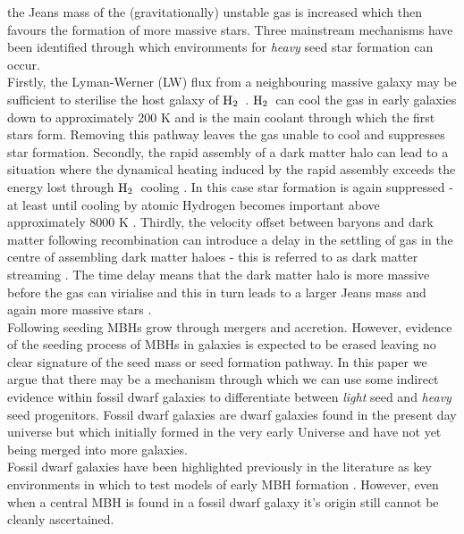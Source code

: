 \documentclass[twocolumn, tighten]{aastex631}
\newcommand{\molH} {$\rm{H_2}$~}
\begin{document}
the Jeans mass of the (gravitationally) unstable gas is increased which then favours the formation of more massive stars. Three mainstream mechanisms have been identified through 
which environments for \textit{heavy} seed star formation can occur. \\
\indent Firstly, the Lyman-Werner (LW) flux from a neighbouring massive galaxy may be sufficient to sterilise the host galaxy of \molH \citep{Dijkstra_2008, Dijkstra_2014, Visbal_2014, Regan_2017}. \molH can cool the gas in
early galaxies down to approximately 200 K and is the main coolant through which the first stars form. Removing this pathway leaves the gas unable to cool and 
suppresses star formation. Secondly, the rapid assembly of a dark matter halo can lead to a situation where the dynamical heating induced by the rapid assembly 
exceeds the energy lost through \molH cooling \citep{Yoshida_2003a, Fernandez_2014, Wise_2019, Regan_2020b}. In this case star formation is again suppressed - at least until cooling by atomic Hydrogen becomes important above approximately 8000 K \citep{Omukai_2001}. Thirdly, the velocity offset between baryons and dark matter following recombination can introduce a delay in the settling of gas in the centre of assembling dark matter haloes - this is referred to as dark matter streaming \citep{Tseliakhovich_2010}. The time delay means that the dark matter halo is more 
massive before the gas can virialise and this in turn leads to a larger Jeans mass and again more massive stars \citep{Tanaka_2014, Hirano_2017, Schauer_2017, Latif_2014c, Kulkarni_2021}.\\
\indent Following seeding MBHs grow through mergers and accretion. However, evidence of the seeding process of MBHs in galaxies is expected to be erased leaving no clear signature of the seed mass or seed formation pathway. In this paper we argue that there may be a mechanism through which we can use some indirect evidence within fossil dwarf galaxies to differentiate between \textit{light} seed and \textit{heavy} seed progenitors. Fossil dwarf galaxies are dwarf galaxies found in the present day universe but which initially formed in the very early Universe and have not yet being merged into more galaxies. \\
\indent Fossil dwarf galaxies have been highlighted previously in the literature as key environments in which to test models of early MBH formation \citep[e.g][]{Volonteri_2008, VanWassenhove_2010}. However, even when a central MBH is found in a fossil dwarf galaxy it's origin still cannot be cleanly ascertained. 
\end{document}
